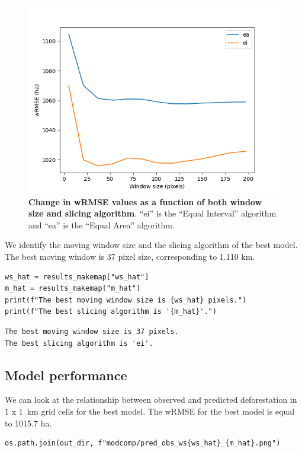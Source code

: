 \documentclass[paper=a4, 12pt, DIV=12]{scrartcl}
\begin{document}
\begin{figure}[H]
\centering
\includegraphics[width=0.8\linewidth]{outputs_kenya/modcomp/mod_comp.png}
\caption{\label{fig:orgad5b6ee}\textbf{Change in wRMSE values as a function of both window size and slicing algorithm}. ``ei'' is the ``Equal Interval'' algorithm and ``ea'' is the ``Equal Area'' algorithm.}
\end{figure}

We identify the moving window size and the slicing algorithm of the best model. The best moving window is 37 pixel size, corresponding to 1.110 km.

\begin{verbatim}
ws_hat = results_makemap["ws_hat"]
m_hat = results_makemap["m_hat"]
print(f"The best moving window size is {ws_hat} pixels.")
print(f"The best slicing algorithm is '{m_hat}'.")
\end{verbatim}

\begin{verbatim}
The best moving window size is 37 pixels.
The best slicing algorithm is 'ei'.
\end{verbatim}

\subsection{Model performance}
\label{sec:org6eb2753}

We can look at the relationship between observed and predicted deforestation in 1 x 1 km grid cells for the best model. The wRMSE for the best model is equal to 1015.7 ha.

\begin{verbatim}
os.path.join(out_dir, f"modcomp/pred_obs_ws{ws_hat}_{m_hat}.png")
\end{verbatim}
\end{document}
